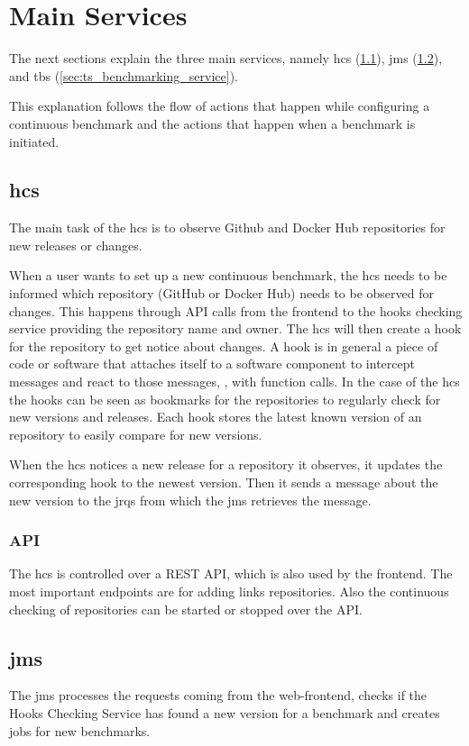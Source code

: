 \section{Main Services}
\label{sec:main_services}
The next sections explain the three main services, namely \acl{hcs} (\ref{sec:hooks_checking_service}), \acl{jms} (\ref{sec:jobs_managing_service}), and \acl{tbs} (\ref{sec:ts_benchmarking_service}).

This explanation follows the flow of actions that happen while configuring a continuous benchmark and the actions that happen when a benchmark is initiated.


\subsection{\acl{hcs}}
\label{sec:hooks_checking_service}
The main task of the \ac{hcs} is to observe Github and Docker Hub repositories for new releases or changes.

When a user wants to set up a new continuous benchmark, the \ac{hcs} needs to be informed which repository (GitHub or Docker Hub) needs to be observed for changes.
This happens through API calls from the frontend to the hooks checking service providing the repository name and owner.
The \ac{hcs} will then create a hook for the repository to get notice about changes.
A hook is in general a piece of code or software that attaches itself to a software component to intercept messages and react to those messages, \eg, with function calls.
In the case of the \ac{hcs} the hooks can be seen as bookmarks for the repositories to regularly check for new versions and releases.
Each hook stores the latest known version of an repository to easily compare for new versions.

When the \ac{hcs} notices a new release for a repository it observes, it updates the corresponding hook to the newest version.
Then it sends a message about the new version to the \aclp{jrq} from which the \acl{jms} retrieves the message.

\subsubsection{API}
\label{sec:hooks_api}
The \ac{hcs} is controlled over a REST API, which is also used by the frontend.
The most important endpoints are for adding links repositories.
Also the continuous checking of repositories can be started or stopped over the API.


\subsection{\acl{jms}}
\label{sec:jobs_managing_service}
The \acf{jms} processes the requests coming from the web-frontend, checks if the Hooks Checking Service has found a new version for a benchmark and creates jobs for new benchmarks.



